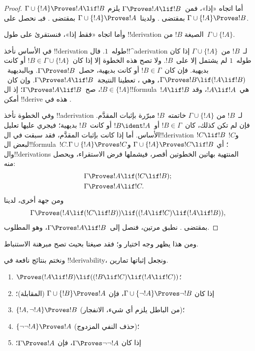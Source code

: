 \documentclass[../../../include/open-logic-section]{subfiles}
\begin{document}
\begin{proof}
أما اتجاه «إذا»، فمن~$\Gamma \Proves !A \lif !B$ يلزم
$\Gamma \cup \{!A\} \Proves !A \lif !B$ بمقتضى
. ولدينا~$\Gamma \cup \{!A\} \Proves !A$
بمقتضى . فبـ نحصل على
$\Gamma \cup \{!A\} \Proves !B$.


وأما اتجاه «فقط إذا»، فنستقرئ على طول !!{derivation} الصيغة
$!B$ من~$\Gamma \cup \{!A\}$.

في الأساس نأخذ !!{derivation} طوله~$1$.
فال!!^a{derivation} لـ~$!B$ من~$\Gamma \cup \{!A\}$ إذا كان
طوله~$1$ لم يشتمل إلا على~$!B$. ولا تصح هذه الخطوة إلا إذا
كان~$!B \in \Gamma \cup \{!A\}$ أو كانت بديهية.
فإن كان~$!B \in \Gamma$ أو كانت بديهية، حصل~$\Gamma \Proves !B$.
وبالبديهية~$\Gamma
\Proves !B \lif (!A \lif !B)$، وهي ،
تعطينا  النتيجة~$\Gamma \Proves !A \lif !B$.
وإن كان~$!B \in \{ !A\}$، صح~$\Gamma \Proves !A \lif !B$؛
إذ ال!!{formula}~$!A \lif !B$ هي~$!A \lif !A$،
وقد أمكن !!{derive} هذه في .

وفي الخطوة نأخذ !!a{derivation} لـ~$!B$ من
$\Gamma \cup \{!A\}$ خاتمته~$!B$ مبرّرة بإثبات المقدَّم.
فإن لم تكن كذلك، كان~$!B \in \Gamma$ أو~$!B
\ident !A$ أو كانت~$!B$ بديهية؛ فيجري عليها تعليل الأساس.
أما إذا كانت بإثبات المقدَّم، فقد سبقت في ال!!{derivation}
$!C \lif !B$ و$!C$ لبعض ال!!{formula}~$!C$؛ أي
$\Gamma \cup \{!A\} \Proves !C \lif !B$ و$\Gamma \cup \{!A\}
\Proves !C$. وال!!{derivation}s المنتهية بهاتين الخطوتين أقصر،
فيشملها فرض الاستقراء، ويحصل منه:
\begin{align*}
  & \Gamma \Proves !A \lif (!C \lif !B); \\
  & \Gamma \Proves !A \lif !C.
\end{align*}
ومن جهة أخرى، لدينا
\[
\Gamma \Proves (!A \lif (!C \lif !B)) \lif
((!A\lif !C)  \lif (!A \lif !B)),
\]
بمقتضى . نطبق  مرتين،
فنصل إلى~$\Gamma \Proves !A \lif !B$، وهو المطلوب.
\end{proof}

ومن هذا يظهر وجه اختيار 
و؛ فقد صيغتا بحيث تصح مبرهنة الاستنباط.

ونختم بنتائج نافعة في !!{derivability}، ونجعل إثباتها تمارين.

\begin{prop}
\begin{enumerate}
\item $\Proves (!A \lif !B) \lif ((!B \lif !C)
  \lif (!A \lif !C))$؛ 
\item إذا كان $\Gamma \cup \{ \lnot !A\}
  \Proves \lnot !B$، فإن $\Gamma \cup \{ !B\} \Proves
  !A$ (المقابلة)؛ 
\item  $\{ !A, \lnot!A\} \Proves
    !B$ (من الباطل يلزم أي شيء، الانفجار)؛ 
\item  $\{ \lnot\lnot!A\} \Proves
  !A$ (حذف النفي المزدوج)؛
\item إذا كان $\Gamma \Proves \lnot\lnot!A$، فإن $\Gamma \Proves
  !A$؛
\end{enumerate}
\end{prop}
\end{document}
